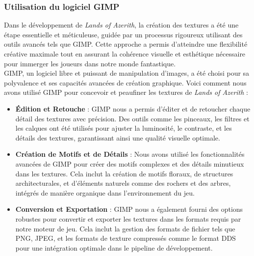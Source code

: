 \subsubsection{Utilisation du logiciel GIMP}

Dans le développement de \textit{Lands of Azerith}, la création des textures a été une étape essentielle et méticuleuse, guidée par un processus rigoureux utilisant des outils avancés tels que GIMP.
Cette approche a permis d'atteindre une flexibilité créative maximale tout en assurant la cohérence visuelle et esthétique nécessaire pour immerger les joueurs dans notre monde fantastique.
\\

GIMP, un logiciel libre et puissant de manipulation d'images, a été choisi pour sa polyvalence et ses capacités avancées de création graphique.
Voici comment nous avons utilisé GIMP pour concevoir et peaufiner les textures de \textit{Lands of Azerith} :
\\

\begin{itemize}
      \item \textbf{Édition et Retouche} : GIMP nous a permis d'éditer et de retoucher chaque détail des textures avec précision.
            Des outils comme les pinceaux, les filtres et les calques ont été utilisés pour ajuster la luminosité, le contraste, et les détails des textures, garantissant ainsi une qualité visuelle optimale.
            \\

      \item \textbf{Création de Motifs et de Détails} : Nous avons utilisé les fonctionnalités avancées de GIMP pour créer des motifs complexes et des détails minutieux dans les textures.
            Cela inclut la création de motifs floraux, de structures architecturales, et d'éléments naturels comme des rochers et des arbres, intégrés de manière organique dans l'environnement du jeu.
            \\

      \item \textbf{Conversion et Exportation} : GIMP nous a également fourni des options robustes pour convertir et exporter les textures dans les formats requis par notre moteur de jeu.
            Cela inclut la gestion des formats de fichier tels que PNG, JPEG, et les formats de texture compressés comme le format DDS pour une intégration optimale dans le pipeline de développement.
\end{itemize}

